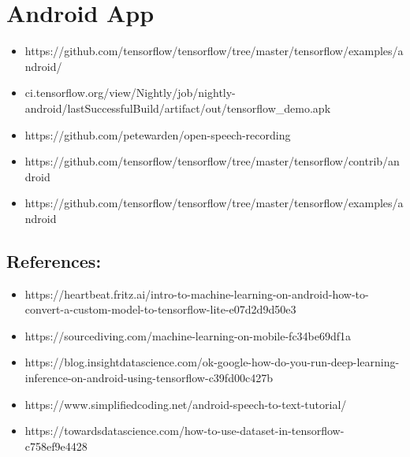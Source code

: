 \documentclass[letterpaper,10pt,english]{sphinxmanual}
\begin{document}
\section{Android App}
\label{\detokenize{References:android-app}}\label{\detokenize{References:android-app}}\begin{itemize}
\item {} 
https://github.com/tensorflow/tensorflow/tree/master/tensorflow/examples/android/

\item {} 
ci.tensorflow.org/view/Nightly/job/nightly-android/lastSuccessfulBuild/artifact/out/tensorflow\_demo.apk

\item {} 
https://github.com/petewarden/open-speech-recording

\item {} 
https://github.com/tensorflow/tensorflow/tree/master/tensorflow/contrib/android

\item {} 
https://github.com/tensorflow/tensorflow/tree/master/tensorflow/examples/android

\end{itemize}


\subsection{References:}
\label{\detokenize{References:references}}\label{\detokenize{References:references}}\begin{itemize}
\item {} 
https://heartbeat.fritz.ai/intro-to-machine-learning-on-android-how-to-convert-a-custom-model-to-tensorflow-lite-e07d2d9d50e3

\item {} 
https://sourcediving.com/machine-learning-on-mobile-fc34be69df1a

\item {} 
https://blog.insightdatascience.com/ok-google-how-do-you-run-deep-learning-inference-on-android-using-tensorflow-c39fd00c427b 

\item {} 
https://www.simplifiedcoding.net/android-speech-to-text-tutorial/  

\item {} 
https://towardsdatascience.com/how-to-use-dataset-in-tensorflow-c758ef9e4428

\end{itemize}
\end{document}
